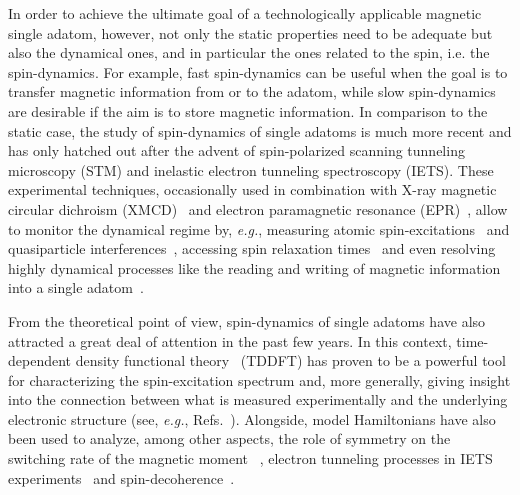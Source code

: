 \documentclass[prb,footinbib,showpacs,twocolumn,amsmath,amssymb]{revtex4}
\begin{document}
In order to achieve the ultimate goal of a technologically applicable magnetic single adatom, however, 
not only the static properties need to be adequate but also 
the dynamical ones, and in particular the ones related to the spin, i.e. the 
spin-dynamics. 
For example, fast spin-dynamics can  be useful when the goal is to transfer magnetic information
from or to the adatom, while slow spin-dynamics are desirable if 
the aim is to store magnetic information.
In comparison to the static case, the study of spin-dynamics of single adatoms 
is much more recent and has only hatched out after the 
advent of   
spin-polarized scanning tunneling microscopy (STM)
and  
inelastic electron tunneling spectroscopy (IETS).
These experimental techniques, occasionally used in combination with X-ray  
magnetic circular dichroism (XMCD)~\cite{donati_magnetic_2016} and 
electron paramagnetic resonance (EPR)~\cite{baumann_electron_2015},
allow  to monitor the 
dynamical regime by, \textit{e.g.}, measuring atomic 
spin-excitations~\cite{heinrich_single-atom_2004,hirjibehedin_large_2007,otte_role_2008,PhysRevLett.106.037205}
and quasiparticle interferences~\cite{PhysRevLett.107.186805},
accessing spin relaxation times~\cite{loth_measurement_2010,baumann_electron_2015}
and even resolving highly dynamical processes like the reading and writing of 
magnetic information into a 
single adatom~\cite{natterer_reading_2017}.


From the theoretical point of view, spin-dynamics of single adatoms
have also attracted a great deal of attention in the past few years. 
In this context, time-dependent 
density functional theory~\cite{PhysRevLett.52.997} 
(TDDFT) has proven to be a powerful tool for characterizing the 
spin-excitation spectrum and, more generally, 
giving insight into the connection between what is measured experimentally
and the underlying electronic structure (see, \textit{e.g.}, Refs.~).
Alongside, model Hamiltonians have also been used to
analyze, among other aspects, the role of symmetry on the switching rate of the magnetic moment
~\cite{hubner_symmetry_2014,khajetoorians_current-driven_2013},
electron tunneling processes in IETS 
experiments~\cite{lorente_efficient_2009,PhysRevLett.102.256802,PhysRevLett.103.050801,fransson_spin_2009,sothmann_nonequilibrium_2010}
and spin-decoherence~\cite{delgado_spin_2010,oberg_control_2014,delgado_spin_2017}.
\end{document}
